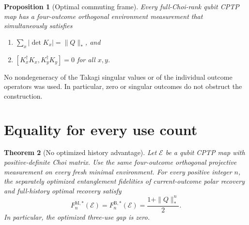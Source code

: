 \documentclass[11pt]{article}
\newtheorem{theorem}{Theorem}[section]
\newtheorem{proposition}[theorem]{Proposition}
\theoremstyle{remark}
\newcommand{\cE}{\mathcal{E}}
\begin{document}
\begin{proposition}[Optimal commuting frame]
\label{prop:commuting-frame}
Every full-Choi-rank qubit CPTP map has a four-outcome orthogonal environment
measurement that simultaneously satisfies
\begin{enumerate}
 \item $\sum_x|\det K_x|=\|Q\|_*$, and
 \item $[K_x^\dagger K_x,K_y^\dagger K_y]=0$ for all $x,y$.
\end{enumerate}
\end{proposition}

No nondegeneracy of the Takagi singular values or of the individual outcome
operators was used.  In particular, zero or singular outcomes do not obstruct
the construction.

\section{Equality for every use count}
\label{sec:main}

\begin{theorem}[No optimized history advantage]
\label{thm:main}
Let $\cE$ be a qubit CPTP map with positive-definite Choi matrix.  Use the
same four-outcome orthogonal projective measurement on every fresh minimal
environment.  For every positive integer $n$, the separately optimized
entanglement fidelities of current-outcome polar recovery and full-history
optimal recovery satisfy
\begin{equation}
 \boxed{
 F^{\mathrm M,*}_n(\cE)=F^{\mathrm B,*}_n(\cE)
 =\frac{1+\|Q\|_*^n}{2}.}
 \label{eq:main-result}
\end{equation}
In particular, the optimized three-use gap is zero.
\end{theorem}
\end{document}
